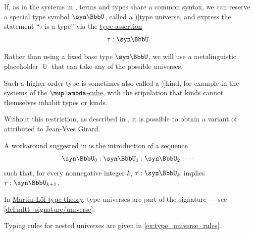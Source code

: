 \begin{concept}\label{con:type_universe}
  If, as in the systems in , terms and types share a common syntax, we can reserve a special type symbol \( \syn\BbbU \), called a \term[en=universe (\cite[\S 1.3]{UnivalentFoundationsProgram2013HoTT})]{type universe}, and express the statement \enquote{\( \tau \) is a type} via the \hyperref[def:type_assertion]{type assertion}
  \begin{equation*}
    \tau: \syn\BbbU.
  \end{equation*}

  Rather than using a fixed base type \( \syn\BbbU \), we will use a metalinguistic placeholder \( \BbbU \) that can take any of the possible universes.

  Such a higher-order type is sometimes also called a \term[en=kind (\cite[def. 5.2]{Barendregt1992LambdaCalculiWithTypes})]{kind}, for example in the systems of the \hyperref[def:lambda_cube]{\( \muplambda \)-cube}, with the stipulation that kinds cannot themselves inhabit types or kinds.

  Without this restriction, as described in \cite[\S 8.2.3]{Mimram2020ProgramEqualsProof}, it is possible to obtain a variant of  attributed to Jean-Yves Girard.

  A workaround suggested in \cite[\S 1.3]{UnivalentFoundationsProgram2013HoTT} is the introduction of a sequence
  \begin{equation*}
    \syn\BbbU_0: \syn\BbbU_1: \syn\BbbU_2: \cdots
  \end{equation*}
  such that, for every nonnegative integer \( k \), \( \tau: \syn\BbbU_k \) implies \( \tau: \syn\BbbU_{k+1} \).
\end{concept}
\begin{comments}
  \item In \hyperref[def:martin_lof_type_theory]{Martin-L\"of type theory}, type universes are part of the signature --- see \cref{def:mltt_signature/universe}.

  \item Typing rules for nested universes are given in \cref{ex:type_universe_rules}.
\end{comments}

